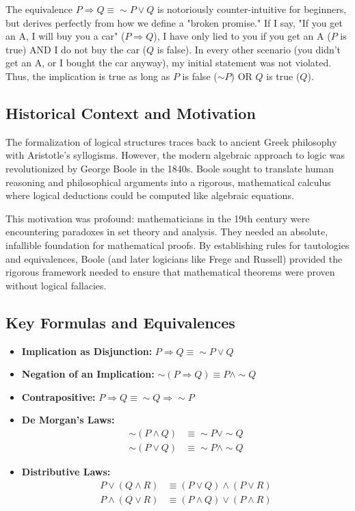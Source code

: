 \documentclass{article}
\begin{document}
The equivalence $P \Rightarrow Q \equiv \sim P \lor Q$ is notoriously counter-intuitive for beginners, but derives perfectly from how we define a "broken promise." If I say, "If you get an A, I will buy you a car" ($P \Rightarrow Q$), I have only lied to you if you get an A ($P$ is true) AND I do not buy the car ($Q$ is false). In every other scenario (you didn't get an A, or I bought the car anyway), my initial statement was not violated. Thus, the implication is true as long as $P$ is false ($\sim P$) OR $Q$ is true ($Q$). 

\subsection*{Historical Context and Motivation}
The formalization of logical structures traces back to ancient Greek philosophy with Aristotle's syllogisms. However, the modern algebraic approach to logic was revolutionized by George Boole in the 1840s. Boole sought to translate human reasoning and philosophical arguments into a rigorous, mathematical calculus where logical deductions could be computed like algebraic equations. 

This motivation was profound: mathematicians in the 19th century were encountering paradoxes in set theory and analysis. They needed an absolute, infallible foundation for mathematical proofs. By establishing rules for tautologies and equivalences, Boole (and later logicians like Frege and Russell) provided the rigorous framework needed to ensure that mathematical theorems were proven without logical fallacies.

\subsection*{Key Formulas and Equivalences}
\begin{itemize}
    \item \textbf{Implication as Disjunction:} $P \Rightarrow Q \equiv \sim P \lor Q$
    \item \textbf{Negation of an Implication:} $\sim(P \Rightarrow Q) \equiv P \land \sim Q$
    \item \textbf{Contrapositive:} $P \Rightarrow Q \equiv \sim Q \Rightarrow \sim P$
    \item \textbf{De Morgan's Laws:} 
    \begin{align*}
        \sim(P \land Q) &\equiv \sim P \lor \sim Q \\
        \sim(P \lor Q) &\equiv \sim P \land \sim Q
    \end{align*}
    \item \textbf{Distributive Laws:}
    \begin{align*}
        P \lor (Q \land R) &\equiv (P \lor Q) \land (P \lor R) \\
        P \land (Q \lor R) &\equiv (P \land Q) \lor (P \land R)
    \end{align*}
\end{itemize}
\end{document}
